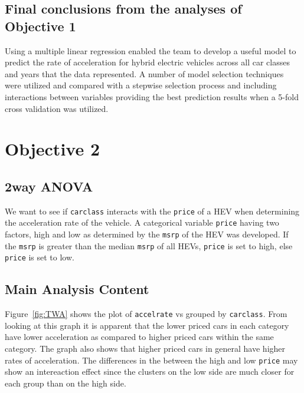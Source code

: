 \documentclass[acmsmall]{acmart}
\begin{document}
\subsection{Final conclusions from the analyses of Objective 1}
Using a multiple linear regression enabled the team to develop a useful model to predict the rate of acceleration for hybrid electric vehicles across all car classes and years that the data represented. A number of model selection techniques were utilized and compared with a stepwise selection process and including interactions between variables providing the best prediction results when a 5-fold cross validation was utilized. 
\section{Objective 2}
\subsection{2way ANOVA}
We want to see if \texttt{carclass} interacts with the \texttt{price} of a HEV when determining the acceleration rate of the vehicle. A categorical variable \texttt{price} having two factors, high and low as determined by the \texttt{msrp} of the HEV was developed.  If the \texttt{msrp} is greater than the median \texttt{msrp} of all HEVs, \texttt{price} is set to high, else \texttt{price} is set to low.
\subsection{Main Analysis Content }
Figure~\ref{fig:TWA} shows the plot of \texttt{accelrate} vs  grouped by \texttt{carclass}. From looking at this graph it is apparent that the lower priced cars in each category have lower acceleration as compared to higher priced cars within the same category. The graph also shows that higher priced cars in general have higher rates of acceleration. The differences in the  between the high and low \texttt{price} may show an intereaction effect since the clusters on the low side are much closer for each group than on the high side.\\
\end{document}
